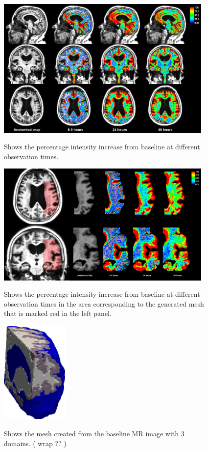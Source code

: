 \documentclass[11pt,a4paper]{article}
\begin{document}
\begin{figure}
\includegraphics[width=0.95\textwidth]{PatID-68-new-100.png} 
\label{fig1} 
\caption{Shows the percentage intensity increase from baseline at different observation times. }
\end{figure}

\begin{figure}
\includegraphics[width=0.95\textwidth]{Zoom-PatID-68.png} 
\label{fig1} 
\caption{Shows the percentage intensity increase from baseline at different observation times in the area corresponding to the generated mesh that is marked red in the left panel.}
\end{figure}

\begin{figure}
\includegraphics[width=0.3\textwidth]{mesh-eps-converted-to.pdf} 
\label{fig1} 
\caption{Shows the mesh created from the baseline MR image with 3 domains. ( wrap ?? ) }
\end{figure}
\end{document}
